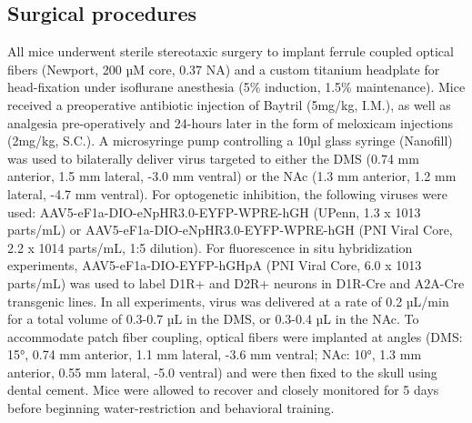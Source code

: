 \subsection{Surgical procedures}
\label{sec:ap1:m2}
All mice underwent sterile stereotaxic surgery to implant ferrule coupled optical fibers (Newport, 200 µM core, 0.37 NA) and a custom titanium headplate for head-fixation under isoflurane anesthesia (5\% induction, 1.5\% maintenance). Mice received a preoperative antibiotic injection of Baytril (5mg/kg, I.M.), as well as analgesia pre-operatively and 24-hours later in the form of meloxicam injections (2mg/kg, S.C.). A microsyringe pump controlling a 10µl glass syringe (Nanofill) was used to bilaterally deliver virus targeted to either the DMS (0.74 mm anterior, 1.5 mm lateral, -3.0 mm ventral) or the NAc (1.3 mm anterior, 1.2 mm lateral, -4.7 mm ventral). For optogenetic inhibition, the following viruses were used: AAV5-eF1a-DIO-eNpHR3.0-EYFP-WPRE-hGH (UPenn, 1.3 x 1013 parts/mL) or AAV5-eF1a-DIO-eNpHR3.0-EYFP-WPRE-hGH (PNI Viral Core, 2.2 x 1014 parts/mL, 1:5 dilution). For fluorescence in situ hybridization experiments, AAV5-eF1a-DIO-EYFP-hGHpA (PNI Viral Core, 6.0 x 1013 parts/mL) was used to label D1R+ and D2R+ neurons in D1R-Cre and A2A-Cre transgenic lines. In all experiments, virus was delivered at a rate of 0.2 µL/min for a total volume of 0.3-0.7 µL in the DMS, or 0.3-0.4 µL in the NAc. To accommodate patch fiber coupling, optical fibers were implanted at angles (DMS: 15°, 0.74 mm anterior, 1.1 mm lateral, -3.6 mm ventral; NAc: 10°, 1.3 mm anterior, 0.55 mm lateral, -5.0 ventral) and were then fixed to the skull using dental cement. Mice were allowed to recover and closely monitored for 5 days before beginning water-restriction and behavioral training.